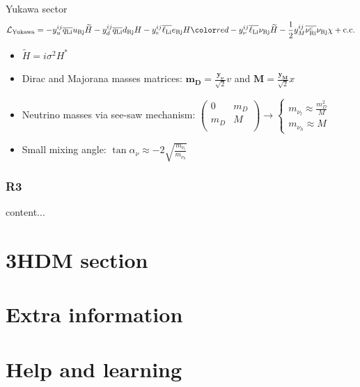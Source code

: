 \documentclass[10pt,xcolor=dvipsnames,mathserif]{beamer}
\begin{document}
\begin{frame}
	\end{frame}
	

\begin{frame}{Yukawa sector}
	\begin{equation*}
	\begin{aligned}
	\mathcal{L}_\mathrm{Yukawa} = 
	-y_u^{ij} \overline{q_\mathrm{L i}} u_\mathrm{R j} \widetilde{H} 
	-y_d^{ij} \overline{q_\mathrm{L i}} d_\mathrm{R j} H
	-y_e^{ij} \overline{\ell_\mathrm{L i}} e_\mathrm{R j} H
	{\red - y_\nu^{ij} \overline{\ell_\mathrm{L i}} \nu_\mathrm{R j} \widetilde{H}
		-\dfrac{1}{2} y_M^{ij} \overline{\nu_\mathrm{R i}^c} \nu_\mathrm{R j} \chi} + \mathrm{c.c.}
	\end{aligned}
	\end{equation*}
	\begin{itemize}
		\item $\widetilde{H} = i \sigma^2 H^*$
		\vskip2mm
		\item Dirac and Majorana masses matrices: $\bm{m_D} = \tfrac{\bm{y_\nu}}{\sqrt{2}} v$ and $\bm{M} = \tfrac{\bm{y_M}}{\sqrt{2}} x$
		\item Neutrino masses via see-saw mechanism: $\begin{pmatrix}
		0 & m_D \\
		m_D & M\\
		\end{pmatrix} \rightarrow 
		\begin{cases}
		m_{\nu_l} \approx \tfrac{m_D^2}{M}\\
		m_{\nu_h} \approx M
		\end{cases}$
		\item Small mixing angle: $\tan \alpha_\nu \approx -2 \sqrt{\tfrac{m_{\nu_l}}{m_{\nu_h}}}$
	\end{itemize}
	
\end{frame}

	
	\begin{frame}
		\frametitle{R3}
		content...
	\end{frame}
	
	\section{3HDM section}
	
	\section{Extra information}
	
	\section{Help and learning}
\end{document}
